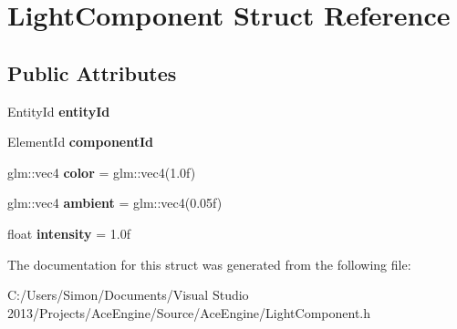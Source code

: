 \hypertarget{struct_light_component}{}\section{Light\+Component Struct Reference}
\label{struct_light_component}
\subsection*{Public Attributes}
\begin{DoxyCompactItemize}
\item 
\hypertarget{struct_light_component_a488a27dbc5dd869dffc4e8e3e25a7ef7}{}Entity\+Id {\bfseries entity\+Id}\label{struct_light_component_a488a27dbc5dd869dffc4e8e3e25a7ef7}

\item 
\hypertarget{struct_light_component_ad6ecbea68301f9e35315a72a3508b62a}{}Element\+Id {\bfseries component\+Id}\label{struct_light_component_ad6ecbea68301f9e35315a72a3508b62a}

\item 
\hypertarget{struct_light_component_a88067da3b3de94d56f4c871635ebce48}{}glm\+::vec4 {\bfseries color} = glm\+::vec4(1.\+0f)\label{struct_light_component_a88067da3b3de94d56f4c871635ebce48}

\item 
\hypertarget{struct_light_component_ac38cdbd51c396bbfa434114f650f1fb4}{}glm\+::vec4 {\bfseries ambient} = glm\+::vec4(0.\+05f)\label{struct_light_component_ac38cdbd51c396bbfa434114f650f1fb4}

\item 
\hypertarget{struct_light_component_a9f90a93fd09511fd414e77e153d87678}{}float {\bfseries intensity} = 1.\+0f\label{struct_light_component_a9f90a93fd09511fd414e77e153d87678}

\end{DoxyCompactItemize}


The documentation for this struct was generated from the following file\+:\begin{DoxyCompactItemize}
\item 
C\+:/\+Users/\+Simon/\+Documents/\+Visual Studio 2013/\+Projects/\+Ace\+Engine/\+Source/\+Ace\+Engine/Light\+Component.\+h\end{DoxyCompactItemize}

